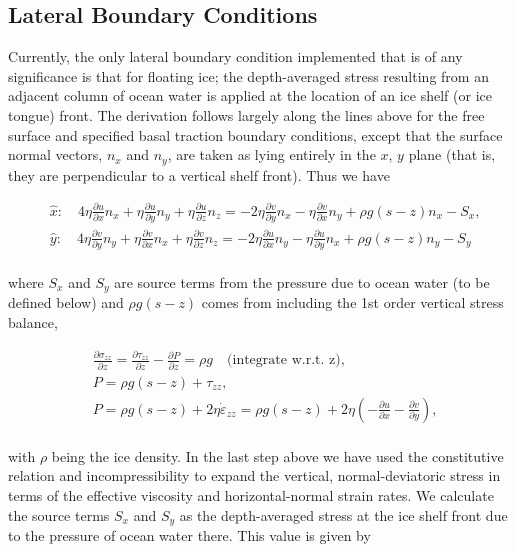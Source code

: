 \subsection{Lateral Boundary Conditions}
Currently, the only lateral boundary condition implemented that is of any significance is that for floating ice; the depth-averaged stress resulting from an adjacent column of ocean water is applied at the location of an ice shelf (or ice tongue) front. The derivation follows largely along the lines above for the free surface and specified basal traction boundary conditions, except that the surface normal vectors, $n_{x}$ and $n_{y}$, are taken as lying entirely in the $x$, $y$ plane (that is, they are perpendicular to a vertical shelf front). Thus we have

\begin{align*}
  & \hat{x}:\quad 4\eta \frac{\partial u}{\partial x}n_{x}+\eta \frac{\partial u}{\partial y}n_{y}+\eta \frac{\partial u}{\partial z}n_{z}=-2\eta \frac{\partial v}{\partial y}n_{x}-\eta \frac{\partial v}{\partial x}n_{y}+\rho g\left( s-z \right)n_{x}-S_{x}, \\ 
 & \hat{y}:\quad 4\eta \frac{\partial v}{\partial y}n_{y}+\eta \frac{\partial v}{\partial x}n_{x}+\eta \frac{\partial v}{\partial z}n_{z}=-2\eta \frac{\partial u}{\partial x}n_{y}-\eta \frac{\partial u}{\partial y}n_{x}+\rho g\left( s-z \right)n_{y}-S_{y} \\ 
\end{align*}

where $S_x$ and $S_y$ are source terms from the pressure due to ocean water (to be defined below) and $\rho g\left( s-z \right)$ comes from including the 1st order vertical stress balance,

\begin{align*}
  & \frac{\partial \sigma _{zz}}{\partial z}=\frac{\partial \tau _{zz}}{\partial z}-\frac{\partial P}{\partial z}=\rho g\quad \text{(integrate w}\text{.r}\text{.t}\text{. z)}, \\ 
 & P=\rho g\left( s-z \right)+\tau _{zz}, \\ 
 & P=\rho g\left( s-z \right)+2\eta \dot{\varepsilon }_{zz}=\rho g\left( s-z \right)+2\eta \left( -\frac{\partial u}{\partial x}-\frac{\partial v}{\partial y} \right), \\ 
\end{align*}

with \textit{\(\rho{}\)} being the ice density. In the last step above we have used the constitutive relation and incompressibility to expand the vertical, normal-deviatoric stress in terms of the effective viscosity and horizontal-normal strain rates. We calculate the source terms $S_x$ and $S_y$ as the depth-averaged stress at the ice shelf front due to the pressure of ocean water there. This value is given by

